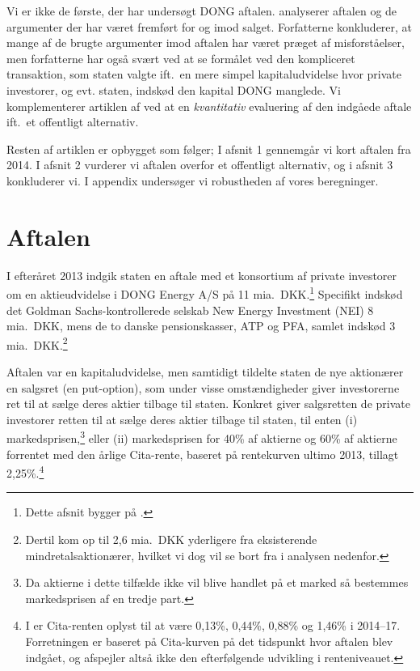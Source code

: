 \documentclass{article}
\begin{document}
Vi er ikke de første, der har undersøgt DONG aftalen. \cite{Bachman2014} analyserer aftalen og de argumenter der har været fremført for og imod salget. Forfatterne konkluderer, at mange af de brugte argumenter imod aftalen har været præget af misforståelser, men forfatterne har også svært ved at se formålet ved den kompliceret transaktion, som staten valgte ift.\ en mere simpel kapitaludvidelse hvor private investorer, og evt. staten, indskød den kapital DONG manglede. Vi komplementerer artiklen af \cite{Bachman2014} ved at en \emph{kvantitativ} evaluering af den indgåede aftale ift.\ et offentligt alternativ. 

Resten af artiklen er opbygget som følger; I afsnit 1 gennemgår vi kort aftalen fra 2014. I afsnit 2 vurderer vi aftalen overfor et offentligt alternativ, og i afsnit 3 konkluderer vi. I appendix undersøger vi robustheden af vores beregninger. 


\section{Aftalen}
I efteråret 2013 indgik staten en aftale med et konsortium af private investorer om en aktieudvidelse i DONG Energy A/S på 11 mia.\ DKK.\footnote{Dette afsnit bygger på \citet{FM2013a}.} Specifikt indskød det Goldman Sachs-kontrollerede selskab New Energy Investment (NEI) 8 mia.\ DKK, mens de to danske pensionskasser, ATP og PFA, samlet indskød 3 mia.\ DKK.\footnote{Dertil kom op til 2,6 mia.\ DKK yderligere fra eksisterende mindretalsaktionærer, hvilket vi dog vil se bort fra i analysen nedenfor.}

Aftalen var en kapitaludvidelse, men samtidigt tildelte staten de nye aktionærer en salgsret (en put-option), som under visse omstændigheder giver investorerne ret til at sælge deres aktier tilbage til staten. Konkret giver salgsretten de private investorer retten til at sælge deres aktier tilbage til staten,  til enten (i) markedsprisen,\footnote{Da aktierne i dette tilfælde ikke vil blive handlet på et marked så bestemmes markedsprisen af en tredje part.} eller (ii) markedsprisen for 40\% af aktierne og 60\% af aktierne forrentet med den årlige Cita-rente, baseret på rentekurven ultimo 2013, tillagt 2,25\%.\footnote{I \citet{FM2013f} er Cita-renten oplyst til at være 0,13\%, 0,44\%, 0,88\% og 1,46\% i 2014--17. Forretningen er baseret på Cita-kurven på det tidspunkt hvor aftalen blev indgået, og afspejler altså ikke den efterfølgende udvikling i renteniveauet.}
\end{document}
